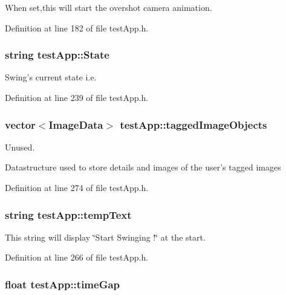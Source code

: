 When set,this will start the overshot camera animation. 



Definition at line 182 of file test\-App.\-h.

\hypertarget{classtest_app_a8ce5505df4526abed238956b65956edd}{
\subsubsection[{State}]{\setlength{\rightskip}{0pt plus 5cm}string test\-App\-::\-State}}\label{classtest_app_a8ce5505df4526abed238956b65956edd}


Swing's current state i.\-e. 



Definition at line 239 of file test\-App.\-h.

\hypertarget{classtest_app_af65c8dc2f4620bfe7fdf6a39043cb48d}{
\subsubsection[{tagged\-Image\-Objects}]{\setlength{\rightskip}{0pt plus 5cm}vector$<${\bf Image\-Data}$>$ test\-App\-::tagged\-Image\-Objects}}\label{classtest_app_af65c8dc2f4620bfe7fdf6a39043cb48d}


Unused. 

Datastructure used to store details and images of the user's tagged images 

Definition at line 274 of file test\-App.\-h.

\hypertarget{classtest_app_ad9a4beab6f2e0f13d32b00b502e89bdc}{
\subsubsection[{temp\-Text}]{\setlength{\rightskip}{0pt plus 5cm}string test\-App\-::temp\-Text}}\label{classtest_app_ad9a4beab6f2e0f13d32b00b502e89bdc}


This string will display \char`\"{}\-Start Swinging !\char`\"{} at the start. 



Definition at line 266 of file test\-App.\-h.

\hypertarget{classtest_app_a944f2713019239a4b49241a5cc9a00c9}{
\subsubsection[{time\-Gap}]{\setlength{\rightskip}{0pt plus 5cm}float test\-App\-::time\-Gap}}\label{classtest_app_a944f2713019239a4b49241a5cc9a00c9}



